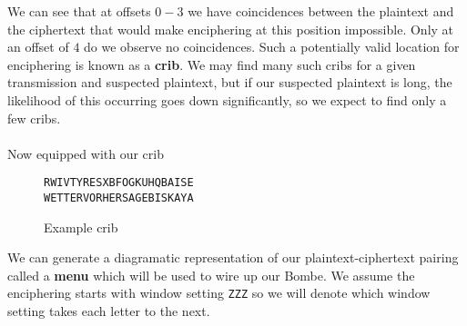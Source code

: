 We can see that at offsets $0-3$ we have coincidences between the
plaintext and the ciphertext that would make enciphering at this
position impossible. Only at an offset of $4$ do we observe no
coincidences. Such a potentially valid location for enciphering is
known as a {\bf{crib}}. We may find many such cribs for a given
transmission and suspected plaintext, but if our suspected plaintext
is long, the likelihood of this occurring goes down significantly, so
we expect to find only a few cribs.
\\\\Now equipped with our crib
\begin{figure}[H]
  \begin{center}
    \texttt{RWIVTYRESXBFOGKUHQBAISE}  \\
    \texttt{WETTERVORHERSAGEBISKAYA} \\
  \end{center}
  \caption{Example crib}
  \label{fig:crib}
\end{figure}
\noindent We can generate a diagramatic representation of our
plaintext-ciphertext pairing called a {\bf{menu}} which will be used
to wire up our Bombe. We assume the enciphering starts with window
setting \texttt{ZZZ} so we will denote which window setting takes
each letter to the next.
